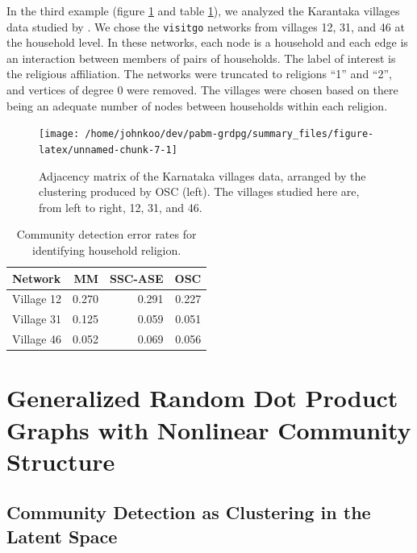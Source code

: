 \documentclass[
  12pt,
]{article}
\theoremstyle{definition}
\theoremstyle{definition}
\theoremstyle{definition}
\theoremstyle{definition}
\theoremstyle{remark}
\begin{document}
In the third example (figure \ref{fig:households-figure} and
table \ref{tab:households-table}),
we analyzed the Karantaka villages data studied by
\citet{DVN/U3BIHX_2013}. We chose the \texttt{visitgo}
networks from villages 12, 31, and 46 at the household level.
In these networks, each node is a household and each edge is
an interaction between members of pairs of households.
The label of interest is the religious affiliation.
The networks were truncated to religions ``1'' and ``2'',
and vertices of degree 0 were removed.
The villages were chosen based on there being an adequate number of nodes
between households within each religion.

\begin{figure}[H]
{\centering \texttt{[image: /home/johnkoo/dev/pabm-grdpg/summary\_files/figure-latex/unnamed-chunk-7-1]}
}
\caption{Adjacency matrix of the Karnataka villages data, arranged by the clustering produced by OSC (left). The villages studied here are, from left to right, 12, 31, and 46.}\label{fig:households-figure}
\end{figure}

\begin{table}[H]
\centering
\begin{tabular}[t]{l|r|r|r}
\hline
Network & MM & SSC-ASE & OSC\\
\hline
Village 12 & 0.270 & 0.291 & 0.227\\
\hline
Village 31 & 0.125 & 0.059 & 0.051\\
\hline
Village 46 & 0.052 & 0.069 & 0.056\\
\hline
\end{tabular}
\caption{\label{tab:households-table}Community detection error rates for identifying household religion.}
\end{table}

\newpage

\hypertarget{sec:mbm}{%
\section{Generalized Random Dot Product Graphs with Nonlinear Community Structure}\label{sec:mbm}}

\hypertarget{community-detection-as-clustering-in-the-latent-space}{%
\subsection{Community Detection as Clustering in the Latent Space}\label{community-detection-as-clustering-in-the-latent-space}}
\end{document}
